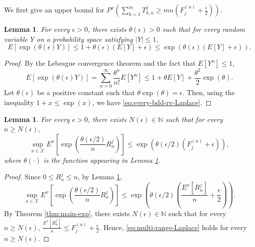 \documentclass[10pt,a4paper]{amsart}
\newtheorem{Lem}[Thm]{Lemma}
\begin{document}
We first give an upper bound for  $\displaystyle P^x \left(  \sum_{k=1}^{m}   T^{j}_{k,n} \ge mn \left(F_j^{(u)} + \frac{\epsilon}{2} \right) \right)$. 

\begin{Lem}\label{lem:Laplace-estimate-bdd}
For every $\epsilon > 0$, there exists $\theta(\epsilon) > 0$ such that 
for every random variable $Y$ on a probability space satisfying $|Y| \le 1$, 
\begin{equation}\label{eq:every-bdd-rv-Laplace}
E\left[\exp(\theta(\epsilon) Y) \right] \le 1 + \theta(\epsilon) (E[Y] + \epsilon) \le \exp\left(  \theta(\epsilon) (E[Y] + \epsilon) \right). 
\end{equation}
\end{Lem}

\begin{proof}
By the Lebesgue convergence theorem and the fact that $E[Y^n] \le 1$, 
\[  E\left[\exp(\theta(\epsilon) Y) \right] = \sum_{n=0}^{\infty} \frac{\theta^n}{n!} E[Y^n] \le 1 + \theta E[Y] + \frac{\theta^2}{2} \exp(\theta).    \]
Let $\theta(\epsilon)$ be a positive constant such that 
$\theta \exp(\theta) = \epsilon$. 
Then, using the inequality $1+x \le \exp(x)$, 
we have \eqref{eq:every-bdd-rv-Laplace}. 
\end{proof}


\begin{Lem}\label{lem:Laplace-estimate-multi-range}
For every $\epsilon > 0$, there exists  $N(\epsilon) \in \mathbb{N}$ such that 
for every $n \ge N(\epsilon)$, 
\begin{equation}\label{eq:multi-range-Laplace}
\sup_{x \in \mathcal{X}} E^x \left[\exp\left(\frac{\theta(\epsilon/2)}{n} R_n^j \right) \right] \le \exp\left(\theta(\epsilon/2) (F_j^{(u)} + \epsilon) \right),
\end{equation}
where $\theta (\cdot)$ is the function appearing in Lemma \ref{lem:Laplace-estimate-bdd}.  
\end{Lem}

\begin{proof}
Since $0 \le R^j_n \le n$, 
by Lemma \ref{lem:Laplace-estimate-bdd}, 
\[ \sup_{x \in \mathcal{X}} E^x \left[\exp\left(\frac{\theta(\epsilon/2)}{n} R_n^j \right) \right] \le \exp\left(  \theta(\epsilon/2) \left(\frac{E^x \left[R_n^j \right] }{n} + \frac{\epsilon}{2} \right) \right). \]
By Theorem \ref{thm:main-exp}, 
there exists $N(\epsilon) \in \mathbb{N}$ such that 
for every $n \ge N(\epsilon)$, 
$\displaystyle \frac{E^x \left[R_n^j \right] }{n} \le F_j^{(u)} + \frac{\epsilon}{2}$. 
Hence, 
\eqref{eq:multi-range-Laplace} holds for every $n \ge N(\epsilon)$. 
\end{proof}
\end{document}

